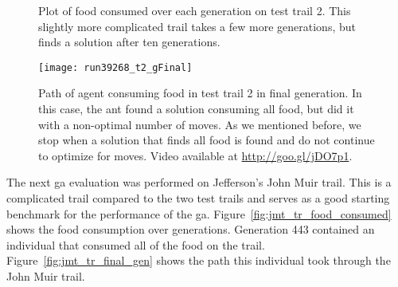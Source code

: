 \begin{figure}[ht]
\centering
{}
\caption[Food Consumed in Test Trail 2]{Plot of food consumed over each generation on test trail 2. This slightly more complicated trail takes a few more generations, but finds a solution after ten generations.}
\label{fig:trail2_food_consumed}
\end{figure}

\begin{figure}[ht]
\centering
\texttt{[image: run39268\_t2\_gFinal]}
\caption[Individual Path in Test Trail 2]{Path of agent consuming food in test trail 2 in final generation. In this case, the ant found a solution consuming all food, but did it with a non-optimal number of moves. As we mentioned before, we stop when a solution that finds all food is found and do not continue to optimize for moves. Video available at \url{http://goo.gl/jDO7p1}.}
\label{fig:trail2_final_gen}
\end{figure}

\clearpage
The next \gls{ga} evaluation was performed on Jefferson's John Muir trail. This is a complicated trail compared to the two test trails and serves as a good starting benchmark for the performance of the \gls{ga}. Figure~\ref{fig:jmt_tr_food_consumed} shows the food consumption over generations. Generation 443 contained an individual that consumed all of the food on the trail. Figure~\ref{fig:jmt_tr_final_gen} shows the path this individual took through the John Muir trail.

